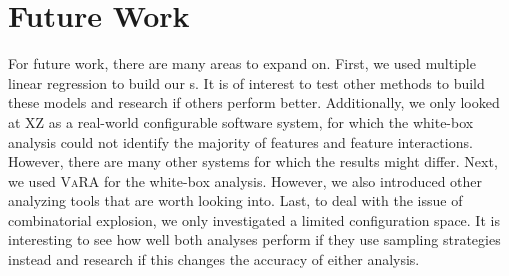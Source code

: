 \section{Future Work}\label{sec:futurework}
For future work, there are many areas to expand on. First, we used multiple linear regression to build our {\perfInfluenceModel}s. 
It is of interest to test other methods to build these models and research if others perform better. 
Additionally, we only looked at \textsc{XZ} as a real-world configurable software system, 
for which the white-box analysis could not identify the majority of features and feature interactions. 
However, there are many other systems for which the results might differ. Next, we used \textsc{VaRA} for the white-box analysis. 
However, we also introduced other analyzing tools that are worth looking into. 
Last, to deal with the issue of combinatorial explosion, we only investigated a limited configuration space. 
It is interesting to see how well both analyses perform if they use sampling strategies instead and 
research if this changes the accuracy of either analysis.